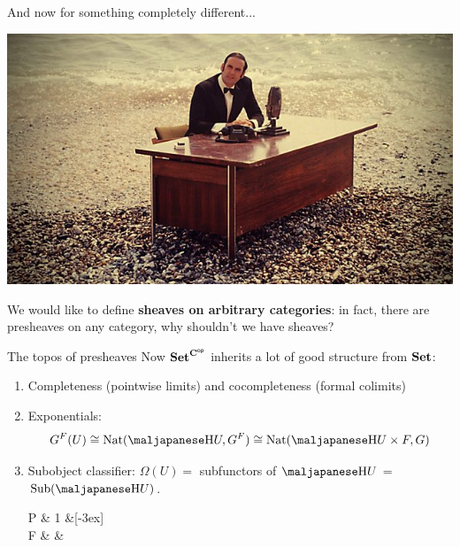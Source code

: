 \begin{frame}{And now for something completely different...}
	\begin{center}
		\includegraphics[width=\textwidth]{figures/something_different.jpg}
	\end{center}
	We would like to define \textbf{sheaves on arbitrary categories}: in fact, there are presheaves on any category, why shouldn't we have sheaves?
\end{frame}

\begin{frame}{The topos of presheaves}
	Now $\mathbf{Set}^{\mathbf{C}^{\mathsf{op}}}$ inherits a lot of good structure from $\mathbf{Set}$:
	\begin{enumerate}
		\item<2-> Completeness (pointwise limits) and cocompleteness (formal colimits)
		\item<3-> Exponentials:
		\begin{equation*}
			G^F(U) \iso \Nat(\yo U, G^F) \iso \Nat(\yo U \times F, G)
		\end{equation*}
		\item<4-> Subobject classifier: $\Omega(U) =$ subfunctors of $\yo U$ = $\Sub(\yo U)$.
		\begin{diagram*}
			P   \& 1  \&[-3ex] \color{colornote}{*} \\
			F  \& \Omega \& 
		\end{diagram*}
	\end{enumerate}
\end{frame}

